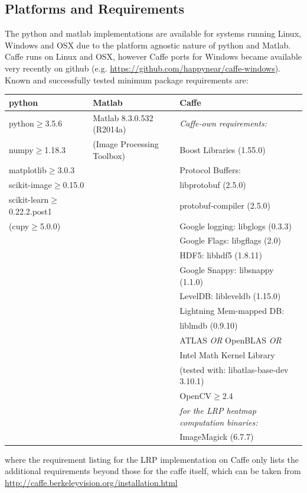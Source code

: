 \documentclass[a4wide]{article}
\begin{document}
\subsection*{Platforms and Requirements}
The python and matlab implementations are available for systems running Linux, Windows and OSX due to the platform agnostic nature of python and Matlab. Caffe runs on Linux and OSX, however Caffe ports for Windows became available very recently on github (e.g. \url{https://github.com/happynear/caffe-windows}). Known and successfully tested minimum package requirements are:
\begin{center}
\begin{tabular}{|l|l|l|}
\hline
\textbf{python} & \textbf{Matlab} & \textbf{Caffe} \\
\hline
python$\geq$3.5.6	& Matlab 8.3.0.532 (R2014a) & \emph{Caffe-own requirements:}   \\
numpy$\geq$1.18.3   & (Image Processing Toolbox)  & Boost Libraries (1.55.0) \\
matplotlib$\geq$3.0.3	   &&  Protocol Buffers:  \\
scikit-image$\geq$0.15.0	   & &  \hspace{5mm} libprotobuf (2.5.0)\\
scikit-learn$\geq$0.22.2.post1			& & \hspace{5mm} protobuf-compiler (2.5.0)  \\
(cupy$\geq$5.0.0)			& & Google logging: libglogs (0.3.3)\\
	   & &  Google Flags: libgflags (2.0)\\
 & &  HDF5: libhdf5 (1.8.11)  \\
		   & & Google Snappy: libsnappy (1.1.0)\\
 & & LevelDB: libleveldb (1.15.0)\\
 		   & & Lightning Mem-mapped DB: \\
 & & \hspace{5mm}  liblmdb (0.9.10) \\
 & &  ATLAS \emph{OR} OpenBLAS \emph{OR} \\
	& & Intel Math Kernel Library \\
	& & (tested with: libatlas-base-dev 3.10.1) \\
 & &  OpenCV$\ge$2.4   \\\cline{3-3}
& &   \emph{for the LRP heatmap computation binaries:}\\
 & & ImageMagick (6.7.7) \\
\hline
\end{tabular}
\end{center}
where the requirement listing for the LRP implementation on Caffe only lists the additional requirements beyond those for the caffe itself, which can be taken from \url{http://caffe.berkeleyvision.org/installation.html}
\end{document}
